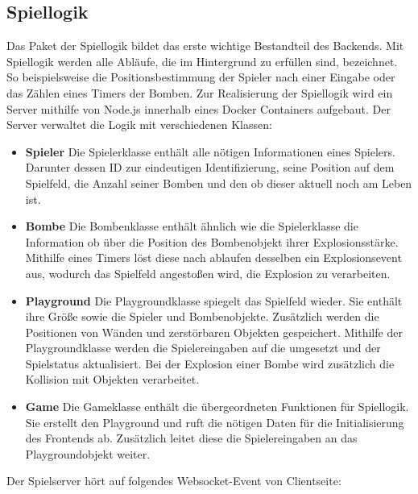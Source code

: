 \documentclass[conference]{IEEEtran}
\begin{document}
\subsection{Spiellogik}
Das Paket der Spiellogik bildet das erste wichtige Bestandteil des Backends. Mit Spiellogik werden alle Abläufe, die im Hintergrund zu erfüllen sind, bezeichnet. So beispielsweise die Positionsbestimmung der Spieler nach einer Eingabe oder das Zählen eines Timers der Bomben. Zur Realisierung der Spiellogik wird ein Server mithilfe von Node.js innerhalb eines Docker Containers aufgebaut. Der Server verwaltet die Logik mit verschiedenen Klassen:

\begin{itemize}
    \item \textbf{Spieler}
    Die Spielerklasse enthält alle nötigen Informationen eines 	Spielers. Darunter dessen ID zur eindeutigen 					Identifizierung, seine Position auf dem Spielfeld, die 			Anzahl seiner Bomben und den ob dieser aktuell noch am 			Leben ist.
    \smallskip
    \item \textbf{Bombe} 
    Die Bombenklasse enthält ähnlich wie die Spielerklasse die 	Information ob über die Position des Bombenobjekt ihrer 		Explosionsstärke. Mithilfe eines Timers löst diese nach 		ablaufen desselben ein Explosionsevent aus, wodurch das 		Spielfeld angestoßen wird, die Explosion zu verarbeiten.
    \smallskip
    \item \textbf{Playground}
    Die Playgroundklasse spiegelt das Spielfeld wieder. Sie 
    enthält ihre Größe sowie die Spieler und Bombenobjekte.
    Zusätzlich werden die Positionen von Wänden und 
    zerstörbaren Objekten gespeichert. Mithilfe der 
    Playgroundklasse werden die Spielereingaben auf die
   	umgesetzt und der Spielstatus aktualisiert. Bei der
   	Explosion einer Bombe wird zusätzlich die Kollision 
   	mit Objekten verarbeitet.
    \smallskip
    \item \textbf{Game}
    Die Gameklasse enthält die übergeordneten Funktionen für
    Spiellogik. Sie erstellt den Playground und ruft die 
    nötigen Daten für die Initialisierung des Frontends ab.
    Zusätzlich leitet diese die Spielereingaben an das
    Playgroundobjekt weiter.
    
\smallskip

\end{itemize}
Der Spielserver hört auf folgendes Websocket-Event von Clientseite:
\end{document}

